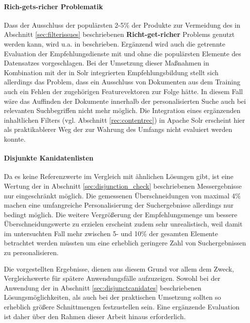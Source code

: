 \paragraph{Rich-gets-richer Problematik} Dass der Ausschluss der populärsten 2-5\% der Produkte zur Vermeidung des in Abschnitt \ref{sec:filterissues} beschriebenen \textbf{Richt-get-richer} Problems genutzt werden kann, wird u.a. in \citep{Cremonesi:2010:PRA:1864708.1864721} beschrieben. Ergänzend wird auch die getrennte Evaluation der Empfehlungsdienste mit und ohne die populärsten Elemente des Datensatzes vorgeschlagen. Bei der Umsetzung dieser Maßnahmen in Kombination mit der in Solr integrierten Empfehlungsbildung stellt sich allerdings das Problem, dass ein Ausschluss von Dokumenten aus dem Training auch ein Fehlen der zugehörigen Featurevektoren zur Folge hätte. In diesem Fall wäre das Auffinden der Dokumente innerhalb der personalisierten Suche auch bei relevanten Suchbegriffen nicht mehr möglich. Die Integration eines ergänzenden inhaltlichen Filters (vgl. Abschnitt \ref{rec:contentrec}) in Apache Solr erscheint hier als praktikablerer Weg der zur Wahrung des Umfangs nicht evaluiert werden konnte.

\paragraph{Disjunkte Kanidatenlisten} Da es keine Referenzwerte im Vergleich mit ähnlichen Lösungen gibt, ist eine Wertung der in Abschnitt \ref{sec:disjunction_check} beschriebenen Messergebnisse nur eingeschränkt möglich. Die gemessenen Überschneidungen von maximal 4\% machen eine umfangreiche Personalisierung der Suchergebnisse allerdings nur bedingt möglich. Die weitere Vergrößerung der Empfehlungsmenge um bessere Überschneidungswerte zu erzielen erscheint zudem sehr unrealistisch, weil damit im untersuchten Fall mehr zwischen  5- und 10\% der gesamten Elemente betrachtet werden müssten um eine erheblich geringere Zahl von Suchergebnissen zu personalisieren.

Die vorgestellten Ergebnisse, dienen aus diesem Grund vor allem dem Zweck, Vergleichswerte für spätere Anwendungsfälle aufzuzeigen. Sowohl bei der Anwendung der in Abschnitt \ref{sec:disjunctcanidates} beschriebenen Lösungsmöglichkeiten, als auch bei der praktischen Umsetzung sollten so erheblich größere Schnittmengen festzustellen sein. Eine ergänzende Evaluation ist daher über den Rahmen dieser Arbeit hinaus erforderlich.


